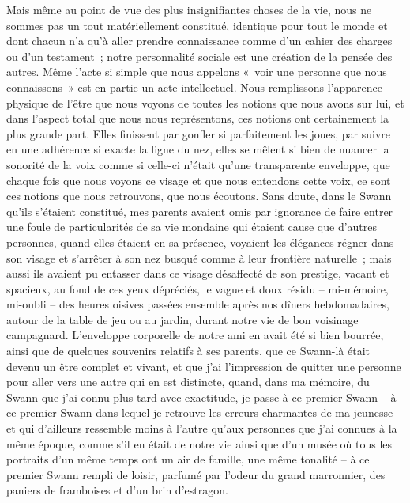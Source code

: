 {Mais même au point de vue des plus insignifiantes choses de la vie,
nous ne sommes pas un tout matériellement constitué, identique pour
tout le monde et dont chacun n'a qu'à aller prendre connaissance
comme d'un cahier des charges ou d'un testament~; notre personnalité
sociale est une création de la pensée des autres. Même l'acte si
simple que nous appelons «~voir une personne que nous connaissons~»
est en partie un acte intellectuel. Nous remplissons l'apparence
physique de l'être que nous voyons de toutes les notions que nous
avons sur lui, et dans l'aspect total que nous nous représentons, ces
notions ont certainement la plus grande part. Elles finissent par
gonfler si parfaitement les joues, par suivre en une adhérence si
exacte la ligne du nez, elles se mêlent si bien de nuancer la
sonorité de la voix comme si celle-ci n'était qu'une transparente
enveloppe, que chaque fois que nous voyons ce visage et que nous
entendons cette voix, ce sont ces notions que nous retrouvons, que
nous écoutons. Sans doute, dans le Swann qu'ils s'étaient constitué,
mes parents avaient omis par ignorance de faire entrer une foule de
particularités de sa vie mondaine qui étaient cause que d'autres
personnes, quand elles étaient en sa présence, voyaient les élégances
régner dans son visage et s'arrêter à son nez busqué comme à leur
frontière naturelle~; mais aussi ils avaient pu entasser dans ce
visage désaffecté de son prestige, vacant et spacieux, au fond de ces
yeux dépréciés, le vague et doux résidu – mi-mémoire, mi-oubli – des
heures oisives passées ensemble après nos dîners hebdomadaires,
autour de la table de jeu ou au jardin, durant notre vie de bon
voisinage campagnard. L'enveloppe corporelle de notre ami en avait
été si bien bourrée, ainsi que de quelques souvenirs relatifs à ses
parents, que ce Swann-là était devenu un être complet et vivant, et
que j'ai l'impression de quitter une personne pour aller vers une
autre qui en est distincte, quand, dans ma mémoire, du Swann que j'ai
connu plus tard avec exactitude, je passe à ce premier Swann – à ce
premier Swann dans lequel je retrouve les erreurs charmantes de ma
jeunesse et qui d'ailleurs ressemble moins à l'autre qu'aux personnes
que j'ai connues à la même époque, comme s'il en était de notre vie
ainsi que d'un musée où tous les portraits d'un même temps ont un air
de famille, une même tonalité – à ce premier Swann rempli de loisir,
parfumé par l'odeur du grand marronnier, des paniers de framboises et
d'un brin d'estragon.
}


